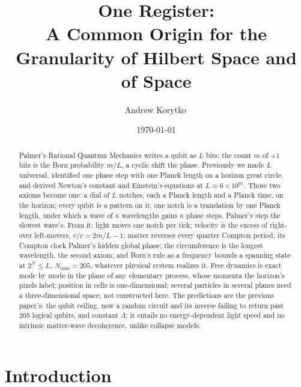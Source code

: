 \documentclass[aps,prd,twocolumn,superscriptaddress,nofootinbib]{revtex4-2}
\begin{document}
\title{One Register:\\ A Common Origin for the Granularity of Hilbert Space and of Space}

\author{Andrew Korytko\,}

\date{\today}

\begin{abstract}
Palmer's Rational Quantum Mechanics writes a qubit as $L$ bits: the count $m$ of $+1$ bits is the Born probability $m/L$, a cyclic shift the phase. Previously we made $L$ universal, identified one phase step with one Planck length on a horizon great circle, and derived Newton's constant and Einstein's equations at $L \approx 6\times10^{61}$. Those two axioms become one: a dial of $L$ notches, each a Planck length and a Planck time, on the horizon; every qubit is a pattern on it; one notch is a translation by one Planck length, under which a wave of $\kappa$ wavelengths gains $\kappa$ phase steps, Palmer's step the slowest wave's. From it: light moves one notch per tick; velocity is the excess of right- over left-movers, $v/c = 2m/L - 1$; matter reverses every quarter Compton period, its Compton clock Palmer's hidden global phase; the circumference is the longest wavelength, the second axiom; and Born's rule as a frequency bounds a spanning state at $2^N \le L$, $N_{\max} = 205$, whatever physical system realizes it. Free dynamics is exact mode by mode in the plane of any elementary process, whose momenta the horizon's pixels label; position in cells is one-dimensional; several particles in several planes need a three-dimensional space, not constructed here. The predictions are the previous paper's: the qubit ceiling, now a random circuit and its inverse failing to return past 205 logical qubits, and constant $\Lambda$; it entails no energy-dependent light speed and no intrinsic matter-wave decoherence, unlike collapse models.
\end{abstract}


\maketitle

\section{Introduction}
\label{sec:intro}
\end{document}
